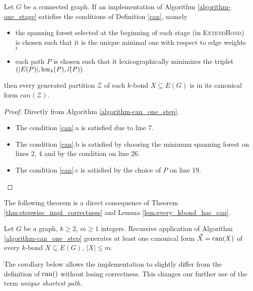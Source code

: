 \begin{lem}
	\label{lem:alg_is_canonical}
	Let $G$ be a connected graph. If an implementation of Algorithm \ref{algorithm-one_stage} satisfies the conditions of Definition \ref{can}, namely

	\begin{itemize}
		\item the spanning forest selected at the beginning of each stage (in \textsc{ExtendBond}) is chosen such that it is the unique minimal one with respect to edge weights $\iota$
		\item each path $P$ is chosen such that it lexicographically minimizes the triplet $(\lvert E(P) \rvert, \operatorname{len}_\lambda(P), \vec{\iota}(P) )$
	\end{itemize}

	then every generated partition $\mathcal{Z}$ of each $k$-bond $X \subseteq E(G)$ is in its canonical form $can(\mathcal{Z})$.
\end{lem}

\begin{proof}
	Directly from Algorithm \ref{algorithm-can_one_step}.
	\begin{itemize}
		\item The condition \ref{can}.a is satisfied due to line 7.
		\item The condition \ref{can}.b is satisfied by choosing the minimum spanning forest on lines 2, 4 and by the condition on line 26.
		\item The condition \ref{can}.c is satisfied by the choice of $P$ on line 19.
	\end{itemize}
\end{proof}

\noindent The following theorem is a direct consequence of Theorem \ref{thm:stepwise_impl_correctness} and Lemma \ref{lem:every_kbond_has_can}.


\begin{thm}
	Let $G$ be a graph, $k \geq 2$, $m \geq 1$ integers. Recursive application of Algorithm \ref{algorithm-can_one_step} generates at least one canonical form $\vec X = \operatorname{can}(X)$ of every $k$-bond $X \subseteq E(G)$, $\lvert X \rvert \leq m$.
\end{thm}


The corollary below allows the implementation to slightly differ from the definition of $\operatorname{can}()$ without losing correctness. This changes our further use of the term \textit{unique shortest path}.

